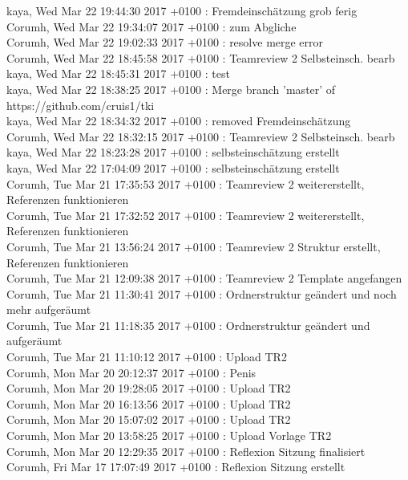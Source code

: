 kaya, Wed Mar 22 19:44:30 2017 +0100 : Fremdeinschätzung grob ferig\\
Corumh, Wed Mar 22 19:34:07 2017 +0100 : zum Abgliche\\
Corumh, Wed Mar 22 19:02:33 2017 +0100 : resolve merge error\\
Corumh, Wed Mar 22 18:45:58 2017 +0100 : Teamreview 2 Selbsteinsch. bearb\\
kaya, Wed Mar 22 18:45:31 2017 +0100 : test\\
kaya, Wed Mar 22 18:38:25 2017 +0100 : Merge branch 'master' of https://github.com/cruis1/tki\\
kaya, Wed Mar 22 18:34:32 2017 +0100 : removed Fremdeinschätzung\\
Corumh, Wed Mar 22 18:32:15 2017 +0100 : Teamreview 2 Selbsteinsch. bearb\\
kaya, Wed Mar 22 18:23:28 2017 +0100 : selbsteinschätzung erstellt\\
kaya, Wed Mar 22 17:04:09 2017 +0100 : selbsteinschätzung erstellt\\
Corumh, Tue Mar 21 17:35:53 2017 +0100 : Teamreview 2 weitererstellt, Referenzen funktionieren\\
Corumh, Tue Mar 21 17:32:52 2017 +0100 : Teamreview 2 weitererstellt, Referenzen funktionieren\\
Corumh, Tue Mar 21 13:56:24 2017 +0100 : Teamreview 2 Struktur erstellt, Referenzen funktionieren\\
Corumh, Tue Mar 21 12:09:38 2017 +0100 : Teamreview 2 Template angefangen\\
Corumh, Tue Mar 21 11:30:41 2017 +0100 : Ordnerstruktur geändert und noch mehr aufgeräumt\\
Corumh, Tue Mar 21 11:18:35 2017 +0100 : Ordnerstruktur geändert und aufgeräumt\\
Corumh, Tue Mar 21 11:10:12 2017 +0100 : Upload TR2\\
Corumh, Mon Mar 20 20:12:37 2017 +0100 : Penis\\
Corumh, Mon Mar 20 19:28:05 2017 +0100 : Upload TR2\\
Corumh, Mon Mar 20 16:13:56 2017 +0100 : Upload TR2\\
Corumh, Mon Mar 20 15:07:02 2017 +0100 : Upload TR2\\
Corumh, Mon Mar 20 13:58:25 2017 +0100 : Upload Vorlage TR2\\
Corumh, Mon Mar 20 12:29:35 2017 +0100 : Reflexion Sitzung finalisiert\\
Corumh, Fri Mar 17 17:07:49 2017 +0100 : Reflexion Sitzung erstellt\\
